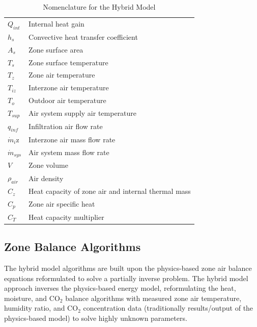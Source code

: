 \begin{table}
\caption{Nomenclature for the Hybrid Model}
\begin{tabular}{ll}
$Q_{int}$ & Internal heat gain\\
$h_s$ & Convective heat transfer coefficient\\
$A_s$ & Zone surface area\\
$T_s$ & Zone surface temperature\\
$T_z$ & Zone air temperature\\
$T_{iz}$ & Interzone air temperature\\
$T_o$ & Outdoor air temperature\\
$T_{sup}$ & Air system supply air temperature\\
$q_{inf}$ & Infiltration air flow rate\\
$\dot{m}_i$z & Interzone air mass flow rate\\
$\dot{m}_{sys}$ & Air system mass flow rate\\
$V$ & Zone volume\\
$\rho_{air}$ & Air density\\
$C_z$ & Heat capacity of zone air and internal thermal mass\\
$C_p$ & Zone air specific heat\\
$C_T$ & Heat capacity multiplier\\
\end{tabular}
\end{table}


\subsection{Zone Balance Algorithms}\label{Zone-air-balance-algorithms}
The hybrid model algorithms are built upon the physics-based zone air balance equations reformulated to solve a partially inverse problem. The hybrid model approach inverses the physics-based energy model, reformulating the heat, moisture, and CO$_2$ balance algorithms with measured zone air temperature, humidity ratio, and CO$_2$ concentration data (traditionally results/output of the physics-based model) to solve highly unknown parameters.

